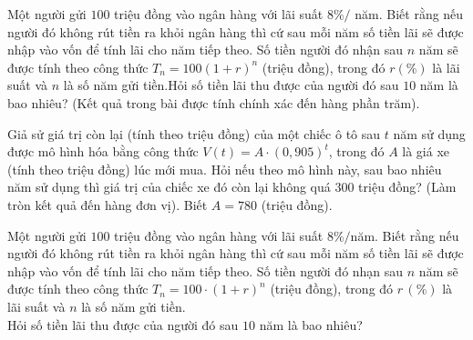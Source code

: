 \begin{ex}%
	Một người gửi $100$ triệu đồng vào ngân hàng với lãi suất $8\% /$ năm. Biết rằng nếu người đó không rút tiền ra khỏi ngân hàng thì cứ sau mỗi năm số tiền lãi sẽ được nhập vào vốn để tính lãi cho năm tiếp theo. Số tiền người đó nhận sau $n$ năm sẽ được tính theo công thức $T_n=100(1+r)^n$ (triệu đồng), trong đó $r(\%)$ là lãi suất và $n$ là số năm gửi tiền.Hỏi số tiền lãi thu được của người đó sau $10$ năm là bao nhiêu? (Kết quả trong bài được tính chính xác đến hàng phần trăm). 
\end{ex}

\begin{ex}%
	Giả sử giá trị còn lại (tính  theo triệu đồng) của một chiếc ô tô sau $t$ năm sử dụng được mô hình hóa bằng công thức $V(t)=A\cdot (0{,}905)^t$, trong đó $A$ là giá xe (tính theo triệu đồng) lúc mới mua. Hỏi nếu theo mô hình này, sau bao nhiêu năm sử dụng thì giá trị của chiếc xe đó còn lại không quá $300$ triệu đồng? (Làm tròn kết quả đến hàng đơn vị). Biết $A=780$ (triệu đồng).
\end{ex}

\begin{ex}%
	Một người gửi $100$ triệu đồng vào ngân hàng với lãi suất $8\%/$năm. Biết rằng nếu người đó không rút tiền  ra khỏi ngân hàng thì cứ sau mỗi năm số tiền lãi sẽ được nhập vào vốn để tính lãi cho năm tiếp theo. Số tiền người đó nhạn sau $n$ năm sẽ được tính theo công thức $T_n=100\cdot (1+r)^{n}$ (triệu đồng), trong đó $r\,(\%)$ là lãi suất và $n$ là số năm gửi tiền.\\
	Hỏi  số tiền lãi thu được của người đó sau $10$ năm là bao nhiêu?
\end{ex}


